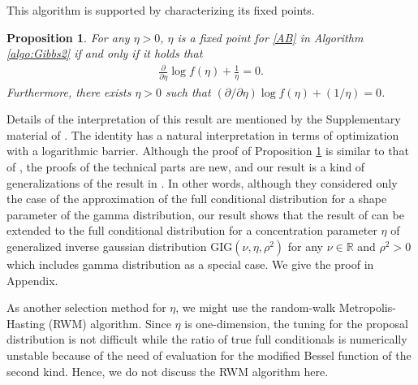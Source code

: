 \documentclass[11pt]{article}
\theoremstyle{plain}
\newtheorem{prop}{Proposition}[section]
\theoremstyle{definition}
\begin{document}
This algorithm is supported by characterizing its fixed points.
\begin{prop}\label{fixed_point}
For any $\eta>0$, $\eta$ is a fixed point for \eqref{AB} in Algorithm \ref{algo:Gibbs2} if and only if it holds that
\begin{align}\label{identity_fixed_point}
\frac{\partial}{\partial \eta}\log f(\eta)+\frac{1}{\eta}=0.
\end{align}
Furthermore, there exists $\eta>0$ such that $(\partial/\partial \eta)\log f(\eta)+(1/\eta)=0$.
\end{prop}

Details of the interpretation of this result are mentioned by the Supplementary material of \cite{M19}. The identity has a natural interpretation in terms of optimization with a logarithmic barrier. Although the proof of Proposition \ref{fixed_point} is similar to that of \cite{M19}, the proofs of the technical parts are new, and our result is a kind of generalizations of the result in \cite{M19}. In other words, although they considered only the case of the approximation of the full conditional distribution for a shape parameter of the gamma distribution, our result shows that the result of \cite{M19} can be extended to the full conditional distribution for a concentration parameter $\eta$ of generalized inverse gaussian distribution $\mathrm{GIG}(\nu,\eta,\rho^2)$ for any $\nu \in \mathbb{R}$ and $\rho^2>0$ which includes gamma distribution as a special case. We give the proof in Appendix. 

As another selection method for $\eta$, we might use the random-walk Metropolis-Hasting (RWM) algorithm. Since $\eta$ is one-dimension, the tuning for the proposal distribution is not difficult while the ratio of true full conditionals is numerically unstable because of the need of evaluation for the modified Bessel function of the second kind. Hence, we do not discuss the RWM algorithm here.
\end{document}
